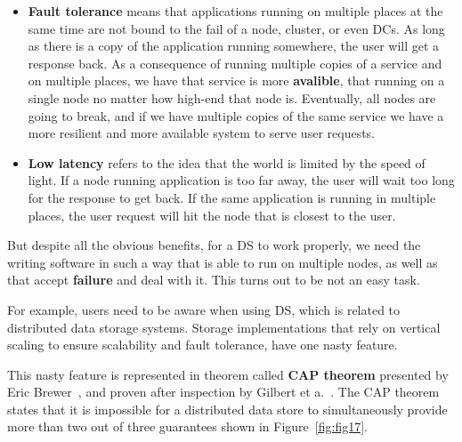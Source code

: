 \begin{itemize}
	\item \textbf{Fault tolerance} means that applications running on multiple places at the same time are not bound to the fail of a node, cluster, or even DCs. As long as there is a copy of the application running somewhere, the user will get a response back. As a consequence of running multiple copies of a service and on multiple places, we have that service is more \textbf{avalible}, that running on a single node no matter how high-end that node is. Eventually, all nodes are going to break, and if we have multiple copies of the same service we have a more resilient and more available system to serve user requests.
	\item \textbf{Low latency} refers to the idea that the world is limited by the speed of light. If a node running application is too far away, the user will wait too long for the response to get back. If the same application is running in multiple places, the user request will hit the node that is closest to the user.
\end{itemize}

\noindent
But despite all the obvious benefits, for a DS to work properly, we need the writing software in such a way that is able to run on multiple nodes, as well as that accept \textbf{failure} and deal with it. This turns out to be not an easy task.

For example, users need to be aware when using DS, which is related to distributed data storage systems. Storage implementations that rely on vertical scaling to ensure scalability and fault tolerance, have one nasty feature. 

This nasty feature is represented in theorem called \textbf{CAP theorem} presented by Eric Brewer~\cite{Brewer2000}, and proven after inspection by Gilbert et a.~\cite{GilbertL02}. The CAP theorem states that it is impossible for a distributed data store to simultaneously provide more than two out of three guarantees shown in Figure~\ref{fig:fig17}.

